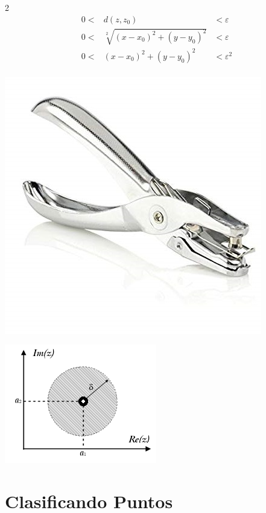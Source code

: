 \documentclass[12pt]{article}
\theoremstyle{definition}
\begin{document}
\begin{multicols} {2}
\begin{eqnarray*}
0<&d(z, z_0)& < \varepsilon\\
0<&\sqrt[2]{(x-x_0)^2 + (y-y_0)^2}& < \varepsilon\\
0<&(x-x_0)^2 + (y-y_0)^2& < \varepsilon^2\\
\end{eqnarray*}

\begin{center}
	\includegraphics[scale=0.25]{perforadora.jpg}
\end{center}

\begin{center}
	\includegraphics[scale=1.1]{entornoReducido.png}
\end{center}
\end{multicols}

\section{Clasificando Puntos}
\end{document}
